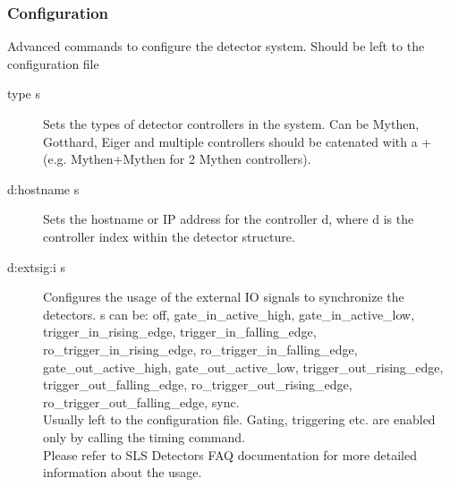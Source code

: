 \documentclass{article}
\begin{document}
\subsubsection{Configuration}
Advanced commands to configure the detector system. Should be left to the configuration file
\begin{description}
\item[type s] Sets the types of detector controllers in the system. Can be Mythen, Gotthard, Eiger and multiple controllers should be catenated with a + (e.g. Mythen+Mythen for 2 Mythen controllers).
\item[d:hostname s] Sets the hostname or IP address for the controller d, where d is the controller index within the detector structure.    
\item[d:extsig:i s] Configures the usage of the external IO signals to synchronize the detectors. s can be:  off, gate\_in\_active\_high, gate\_in\_active\_low, trigger\_in\_rising\_edge,
                         trigger\_in\_falling\_edge,
                         ro\_trigger\_in\_rising\_edge,
                         ro\_trigger\_in\_falling\_edge,
                         gate\_out\_active\_high,
                         gate\_out\_active\_low,
                         trigger\_out\_rising\_edge,
                         trigger\_out\_falling\_edge,
                         ro\_trigger\_out\_rising\_edge,
                         ro\_trigger\_out\_falling\_edge, sync. \\Usually left to the configuration file. Gating, triggering etc. are enabled only by calling the timing command. \\
Please refer to SLS Detectors FAQ documentation for more detailed information about the usage.
      

\end{description}
\end{document}
